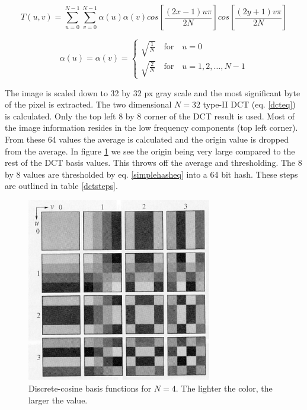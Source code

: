 \documentclass[english,12pt,a4paper,pdftex,elec,utf8]{aaltothesis}
\begin{document}
\begin{equation}\label{dcteq}
T(u,v)= \sum_{u=0}^{N-1} \sum_{v=0}^{N-1}\alpha(u)\alpha(v)cos\left[\frac{(2x-1)u\pi}{2N}\right]cos\left[\frac{(2y + 1)v\pi}{2N}\right]
\end{equation}

\begin{equation}\label{dctcoefeq}
  \alpha(u) = \alpha(v)= \begin{cases}
    \sqrt{\frac{1}{N}} \quad \textrm{for} \quad u=0\\
    \sqrt{\frac{2}{N}} \quad \textrm{for} \quad u=1,2,\ldots,N-1
    \end{cases}
\end{equation}

The image is scaled down to 32 by 32 px gray scale and the most significant byte of the pixel is extracted. The two dimensional $N=32$ type-II DCT (eq. \ref{dcteq}) is calculated. Only the top left 8 by 8 corner of the DCT result is used. Most of the image information resides in the low frequency components (top left corner). From these 64 values the average is calculated and the origin value is dropped from the average. In figure \ref{dctkernels} we see the origin being very large compared to the rest of the DCT basis values. This throws off the average and thresholding. The 8 by 8 values are thresholded by eq. \ref{simplehasheq} into a 64 bit hash. These steps are outlined in table \ref{dctsteps}.

\begin{figure}[htb]
\begin{center}
\includegraphics[height=8cm]{figures/dct}
\end{center}
\caption{Discrete-cosine basis functions for $N = 4$. The lighter the color, the larger the value. \cite[p. 473]{Gonzalez2002}}
\label{dctkernels}
\end{figure}
\end{document}
